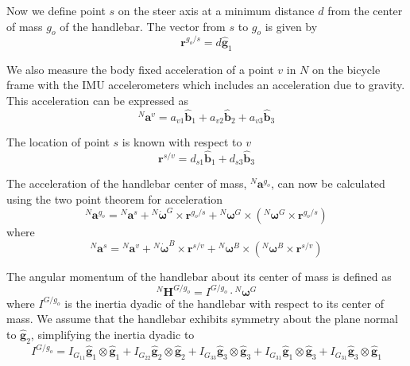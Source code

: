 \documentclass[10pt]{article}
\begin{document}
Now we define point $s$ on the steer axis at a minimum distance $d$ from the
center of mass $g_o$ of the handlebar. The vector from $s$ to $g_o$ is given by 
%
\begin{equation}
  \mathbf{r}^{g_o/s} = d\hat{\mathbf{g}}_1
\end{equation}

We also measure the body fixed acceleration of a point $v$ in $N$ on the
bicycle frame with the IMU accelerometers which includes an acceleration due
to gravity. This acceleration can be expressed as
%
\begin{equation}
  ^N\mathbf{a}^v =
    a_{v1}\hat{\mathbf{b}}_1 +
    a_{v2}\hat{\mathbf{b}}_2 +
    a_{v3}\hat{\mathbf{b}}_3
  \label{eq:acceleration-of-v}
\end{equation}

The location of point $s$ is known with respect to $v$ 
%
\begin{equation}
  \mathbf{r}^{s/v} = d_{s1}\hat{\mathbf{b}}_1 + d_{s3}\hat{\mathbf{b}}_3
\end{equation}

The acceleration of the handlebar center of mass, $^N\mathbf{a}^{g_o}$, can
now be calculated using the two point theorem for acceleration \cite{Kane1985}
%
\begin{equation}
  ^N\mathbf{a}^{g_o} = {}^N\mathbf{a}^s +
    {}^N\dot{\boldsymbol{\omega}}^G\times\mathbf{r}^{g_o/s} +
    {}^N\boldsymbol{\omega}^G\times({}^N\boldsymbol{\omega}^G\times\mathbf{r}^{g_o/s})
\end{equation}
where
\begin{equation}
  ^N\mathbf{a}^s = {}^N\mathbf{a}^v +
    {}^N\dot{\boldsymbol{\omega}}^B\times\mathbf{r}^{s/v} +
    {}^N\boldsymbol{\omega}^B\times({}^N\boldsymbol{\omega}^B\times\mathbf{r}^{s/v})
\end{equation}

The angular momentum of the handlebar about its center of mass is defined as
%
\begin{equation}
  ^N\mathbf{H}^{G/g_o} = I^{G/g_o} \cdot {}^N\boldsymbol{\omega}^G
\end{equation}
%
where $I^{G/g_o}$ is the inertia dyadic of the handlebar with respect to its
center of mass. We assume that the handlebar exhibits symmetry about the plane
normal to $\hat{\mathbf{g}}_2$, simplifying the inertia dyadic to
%
\begin{equation}
  I^{G/g_o} =
    I_{G_{11}} \hat{\mathbf{g}}_1 \otimes \hat{\mathbf{g}}_1 +
    I_{G_{22}} \hat{\mathbf{g}}_2 \otimes \hat{\mathbf{g}}_2 +
    I_{G_{33}} \hat{\mathbf{g}}_3 \otimes \hat{\mathbf{g}}_3 +
    I_{G_{31}} \hat{\mathbf{g}}_1 \otimes \hat{\mathbf{g}}_3 +
    I_{G_{31}} \hat{\mathbf{g}}_3 \otimes \hat{\mathbf{g}}_1
\end{equation}
\end{document}

